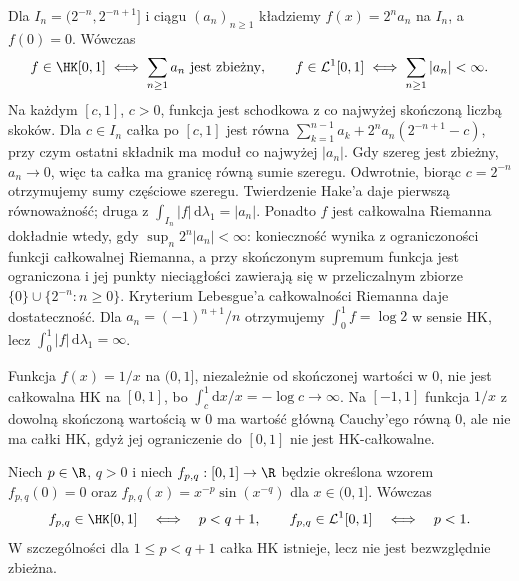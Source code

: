 \begin{przyklad}
Dla $I_n=(2^{-n},2^{-n+1}]$ i ciągu $(a_n)_{n\ge1}$ kładziemy $f(x)=2^n a_n$ na $I_n$, a $f(0)=0$. Wówczas
\[
f\in\HK[0,1]\iff\sum_{n\ge1}a_n\ \text{jest zbieżny},\qquad
f\in\mathcal L^1[0,1]\iff\sum_{n\ge1}|a_n|<\infty.
\]
Na każdym $[c,1]$, $c>0$, funkcja jest schodkowa z co najwyżej skończoną liczbą skoków. Dla $c\in I_n$ całka po $[c,1]$ jest równa $\sum_{k=1}^{n-1}a_k+2^na_n(2^{-n+1}-c)$, przy czym ostatni składnik ma moduł co najwyżej $|a_n|$. Gdy szereg jest zbieżny, $a_n\to0$, więc ta całka ma granicę równą sumie szeregu. Odwrotnie, biorąc $c=2^{-n}$ otrzymujemy sumy częściowe szeregu. Twierdzenie Hake'a daje pierwszą równoważność; druga z $\int_{I_n}|f|\,\mathrm d\lambda_1=|a_n|$. Ponadto $f$ jest całkowalna Riemanna dokładnie wtedy, gdy $\sup_n2^n|a_n|<\infty$: konieczność wynika z ograniczoności funkcji całkowalnej Riemanna, a przy skończonym supremum funkcja jest ograniczona i jej punkty nieciągłości zawierają się w przeliczalnym zbiorze $\{0\}\cup\{2^{-n}:n\ge0\}$. Kryterium Lebesgue'a całkowalności Riemanna daje dostateczność. Dla $a_n=(-1)^{n+1}/n$ otrzymujemy $\int_0^1f=\log2$ w sensie HK, lecz $\int_0^1|f|\,\mathrm d\lambda_1=\infty$.
\end{przyklad}
\begin{przyklad}
Funkcja $f(x)=1/x$ na $(0,1]$, niezależnie od skończonej wartości w $0$, nie jest całkowalna HK na $[0,1]$, bo $\int_c^1\mathrm dx/x=-\log c\to\infty$. Na $[-1,1]$ funkcja $1/x$ z dowolną skończoną wartością w $0$ ma wartość główną Cauchy'ego równą $0$, ale nie ma całki HK, gdyż jej ograniczenie do $[0,1]$ nie jest HK-całkowalne.
\end{przyklad}
\begin{twierdzenie}\label{ma1:kh:tw:hk-oscylacyjne}\label{tw:hk-oscylacyjne}
Niech $p\in\R$, $q>0$ i niech $f_{p,q}:[0,1]\to\R$ będzie określona wzorem $f_{p,q}(0)=0$ oraz $f_{p,q}(x)=x^{-p}\sin(x^{-q})$ dla $x\in(0,1]$. Wówczas
\[
 f_{p,q}\in\HK[0,1]\quad\Longleftrightarrow\quad p<q+1,
 \qquad f_{p,q}\in\mathcal L^1[0,1]\quad\Longleftrightarrow\quad p<1.
\]
W szczególności dla $1\le p<q+1$ całka HK istnieje, lecz nie jest bezwzględnie zbieżna.
\end{twierdzenie}
